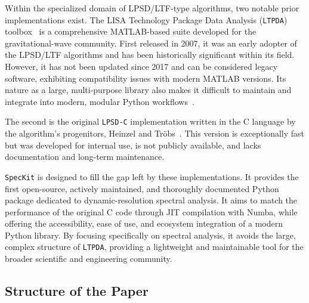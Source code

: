 \documentclass[final, 5p, times, twocolumn, number, sort&compress]{elsarticle}
\newcommand{\speckit}{\texttt{SpecKit}}
\begin{document}
Within the specialized domain of LPSD/LTF-type algorithms, two notable prior implementations exist. The LISA Technology Package Data Analysis (\texttt{LTPDA}) toolbox~\cite{Hewitson2009, HewitsonLTPDA} is a comprehensive MATLAB-based suite developed for the gravitational-wave community. First released in 2007, it was an early adopter of the LPSD/LTF algorithms and has been historically significant within its field. However, it has not been updated since 2017 and can be considered legacy software, exhibiting compatibility issues with modern MATLAB versions. Its nature as a large, multi-purpose library also makes it difficult to maintain and integrate into modern, modular Python workflows~\cite{python-language-reference}.

The second is the original \texttt{LPSD-C} implementation written in the C language by the algorithm's progenitors, Heinzel and Tr\"obs~\cite{LPSDC}. This version is exceptionally fast but was developed for internal use, is not publicly available, and lacks documentation and long-term maintenance.

\speckit{} is designed to fill the gap left by these implementations. It provides the first open-source, actively maintained, and thoroughly documented Python package dedicated to dynamic-resolution spectral analysis. It aims to match the performance of the original C code through JIT compilation with Numba, while offering the accessibility, ease of use, and ecosystem integration of a modern Python library. By focusing specifically on spectral analysis, it avoids the large, complex structure of \texttt{LTPDA}, providing a lightweight and maintainable tool for the broader scientific and engineering community.


\subsection{Structure of the Paper}
\label{sec:structure}
\end{document}
